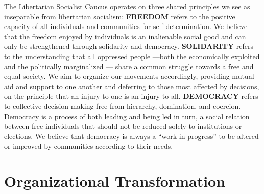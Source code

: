\documentclass[10pt]{memoir}
\begin{document}
The Libertarian Socialist Caucus operates on three shared principles we see as inseparable from libertarian socialism:
\vfill
\textbf{FREEDOM} refers to the positive capacity of all individuals and communities for self-determination. We believe that the freedom enjoyed by individuals is an inalienable social good and can only be strengthened through solidarity and democracy.
\vfill
\textbf{SOLIDARITY} refers to the understanding that all oppressed people ---both the economically exploited and the politically marginalized --- share a common struggle towards a free and equal society. We aim to organize our movements accordingly, providing mutual aid and support to one another and deferring to those most affected by decisions, on the principle that an injury to one is an injury to all.
\vfill
\textbf{DEMOCRACY} refers to collective decision-making free from hierarchy, domination, and coercion. Democracy is a process of both leading and being led in turn, a social relation between free individuals that should not be reduced solely to institutions or elections. We believe that democracy is always a ``work in progress'' to be altered or improved by communities according to their needs.
\vfill
\pagebreak

\section*{Organizational Transformation}
\end{document}
